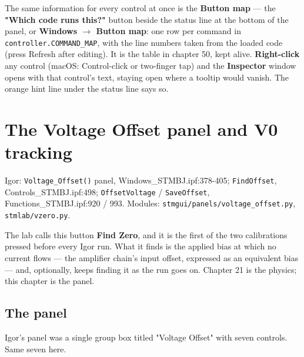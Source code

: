 The same information for every control at once is the \textbf{Button map} --- the \textbf{"Which code runs this?"} button beside the status line at the bottom of the panel, or \textbf{Windows $\rightarrow$ Button map}: one row per command in \texttt{controller.\discretionary{}{}{}COMMAND\_\discretionary{}{}{}MAP}, with the line numbers taken from the loaded code (press Refresh after editing). It is the table in chapter 50, kept alive. \textbf{Right-click} any control (macOS: Control-click or two-finger tap) and the \textbf{Inspector} window opens with that control's text, staying open where a tooltip would vanish. The orange hint line under the status line says so.

\setcounter{chapter}{42}
\chapter{The Voltage Offset panel and V0 tracking}

\begin{keybox}\small Igor: \texttt{Voltage\_\discretionary{}{}{}Offset()} panel, Windows\_STMBJ.ipf:378-405; \texttt{Find\discretionary{}{}{}Offset}, Controls\_STMBJ.ipf:498; \texttt{Offset\discretionary{}{}{}Voltage} / \texttt{Save\discretionary{}{}{}Offset}, Functions\_STMBJ.ipf:920 / 993. Modules: \texttt{stmgui/\discretionary{}{}{}panels/\discretionary{}{}{}voltage\_\discretionary{}{}{}offset.\discretionary{}{}{}py}, \texttt{stmlab/\discretionary{}{}{}vzero.\discretionary{}{}{}py}.\end{keybox}

The lab calls this button \textbf{Find Zero}, and it is the first of the two calibrations pressed before every Igor run. What it finds is the applied bias at which no current flows --- the amplifier chain's input offset, expressed as an equivalent bias --- and, optionally, keeps finding it as the run goes on. Chapter 21 is the physics; this chapter is the panel.

\section{The panel}

Igor's panel was a single group box titled "Voltage Offset" with seven controls. Same seven here.

